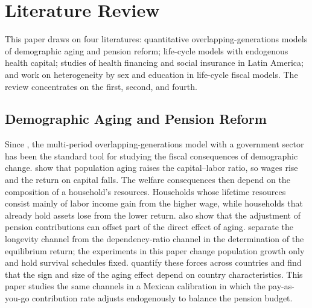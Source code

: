 \section{Literature Review}
\label{sec:lit}

This paper draws on four literatures: quantitative overlapping-generations models of demographic aging and pension reform; life-cycle models with endogenous health capital; studies of health financing and social insurance in Latin America; and work on heterogeneity by sex and education in life-cycle fiscal models. The review concentrates on the first, second, and fourth.

\subsection{Demographic Aging and Pension Reform}
\label{subsec:lit_pension}

Since \citet{AuerbachKotlikoff1987}, the multi-period overlapping-generations model with a government sector has been the standard tool for studying the fiscal consequences of demographic change. \citet{KruegerLudwig2007} show that population aging raises the capital--labor ratio, so wages rise and the return on capital falls. The welfare consequences then depend on the composition of a household's resources. Households whose lifetime resources consist mainly of labor income gain from the higher wage, while households that already hold assets lose from the lower return. \citet{KruegerLudwig2007} also show that the adjustment of pension contributions can offset part of the direct effect of aging. \citet{CarvalhoFerreroNechio2016} separate the longevity channel from the dependency-ratio channel in the determination of the equilibrium return; the experiments in this paper change population growth only and hold survival schedules fixed. \citet{AuclertEtAl2021} quantify these forces across countries and find that the sign and size of the aging effect depend on country characteristics. This paper studies the same channels in a Mexican calibration in which the pay-as-you-go contribution rate adjusts endogenously to balance the pension budget.


